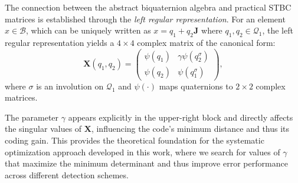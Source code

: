 The connection between the abstract biquaternion algebra and practical STBC matrices is established through the \emph{left regular representation}. 
For an element $x \in \mathcal{B}$, which can be uniquely written as $x = q_1 + q_2 \mathbf{J}$ where $q_1, q_2 \in \mathcal{Q}_1$, the left regular representation yields a $4 \times 4$ complex matrix of the canonical form:
\begin{equation}
\mathbf{X}(q_1, q_2) = 
\begin{pmatrix}
\psi(q_1) & \gamma \psi(q_2^{\sigma}) \\
\psi(q_2) & \psi(q_1^{\sigma})
\end{pmatrix},
\end{equation}
where $\sigma$ is an involution on $\mathcal{Q}_1$ and $\psi(\cdot)$ maps quaternions to $2 \times 2$ complex matrices.

The parameter $\gamma$ appears explicitly in the upper-right block and directly affects the singular values of $\mathbf{X}$, influencing the code's minimum distance and thus its coding gain.
This provides the theoretical foundation for the systematic optimization approach developed in this work, where we search for values of $\gamma$ that maximize the minimum determinant and thus improve error performance across different detection schemes.
